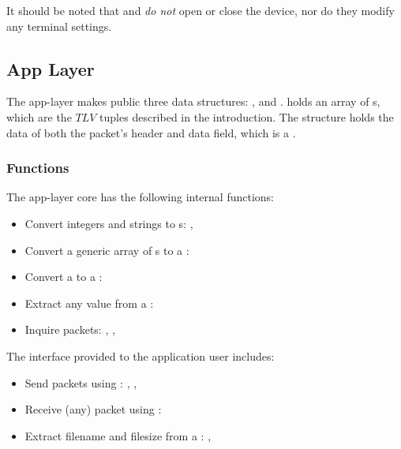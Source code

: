 \documentclass[main.tex]{subfiles}
\begin{document}
It should be noted that  and  \emph{do not} open or close the device, nor do they modify any terminal settings.

\subsection{App Layer}
\label{subsec:alarch}

The app-layer makes public three data structures: ,  and .  holds an array of s, which are the $TLV$ tuples described in the introduction. The  structure holds the data of both the packet's header and data field, which is a .

\subsubsection{Functions}
\label{subsubsec:funcalarch}

The app-layer core has the following internal functions:

\begin{itemize}[noitemsep,rightmargin=3em]
\item Convert integers and strings to s:
, 

\item Convert a generic array of s to a :

\item Convert a  to a :

\item Extract any  value from a :

\item Inquire packets:
, , 
\end{itemize}

The interface provided to the application user includes:

\begin{itemize}[noitemsep,rightmargin=3em]
\item Send packets using :
, , 

\item Receive (any) packet using :

\item Extract filename and filesize from a :
, 
\end{itemize}
\end{document}

